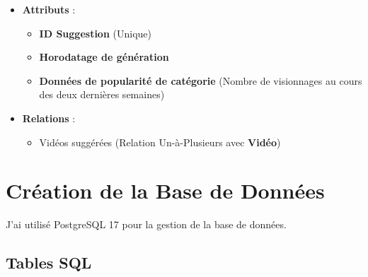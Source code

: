 \documentclass{article}
\begin{document}
\begin{itemize}
    \item \textbf{Attributs} :
    \begin{itemize}
        \item \textbf{ID Suggestion} (Unique)
        \item \textbf{Horodatage de génération}
        \item \textbf{Données de popularité de catégorie} (Nombre de visionnages au cours des deux dernières semaines)
    \end{itemize}
    \item \textbf{Relations} :
    \begin{itemize}
        \item Vidéos suggérées (Relation Un-à-Plusieurs avec \textbf{Vidéo})
    \end{itemize}
\end{itemize}

\section{Création de la Base de Données}

J'ai utilisé PostgreSQL 17 pour la gestion de la base de données.

\subsection{Tables SQL}
\end{document}
